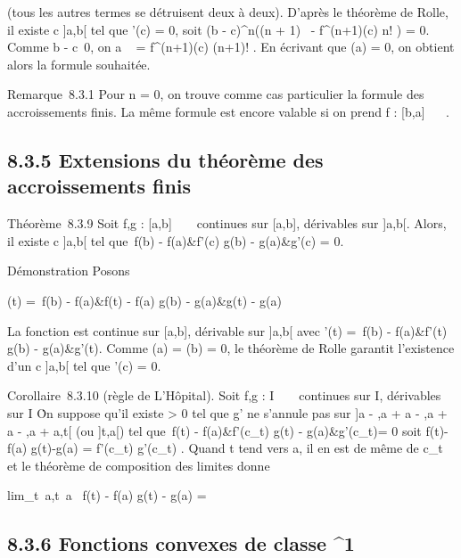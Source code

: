 (tous les autres termes se détruisent deux à deux). D'après le théorème
de Rolle, il existe c \in]a,b[ tel que \phi'(c) = 0, soit (b -
c)^n\left ((n + 1)\lambda~ - f^(n+1)(c)
\over n! \right ) = 0. Comme b -
c\neq~0, on a \lambda~ = f^(n+1)(c)
\over (n+1)! . En écrivant que \phi(a) = 0, on obtient
alors la formule souhaitée.

Remarque~8.3.1 Pour n = 0, on trouve comme cas particulier la formule
des accroissements finis. La même formule est encore valable si on prend
f : [b,a] \rightarrow~ ~.

\subsection{8.3.5 Extensions du théorème des accroissements finis}

Théorème~8.3.9 Soit f,g : [a,b] \rightarrow~ ~ continues sur [a,b],
dérivables sur ]a,b[. Alors, il existe c \in]a,b[ tel que
\left
\matrix\,f(b) - f(a)&f'(c)
\cr g(b) - g(a)&g'(c)\right 
= 0.

Démonstration Posons

\phi(t) = \left
\matrix\,f(b) - f(a)&f(t) -
f(a) \cr g(b) - g(a)&g(t) - g(a)\right


La fonction \phi est continue sur [a,b], dérivable sur ]a,b[ avec
\phi'(t) = \left
\matrix\,f(b) - f(a)&f'(t)
\cr g(b) - g(a)&g'(t)\right .
Comme \phi(a) = \phi(b) = 0, le théorème de Rolle garantit l'existence d'un c
\in]a,b[ tel que \phi'(c) = 0.

Corollaire~8.3.10 (règle de L'Hôpital). Soit f,g : I \rightarrow~ ~ continues sur
I, dérivables sur I \diagdown\a\. On suppose
qu'il existe \eta > 0 tel que g' ne s'annule pas sur ]a -
\eta,a + a - \eta,a +
a - \eta,a +
a,t[ (ou ]t,a[) tel que \left
\matrix\,f(t) -
f(a)&f'(c_t) \cr g(t) -
g(a)&g'(c_t)\right  = 0 soit 
f(t)-f(a) \over g(t)-g(a) = f'(c_t)
\over g'(c_t) . Quand t tend vers a, il en est
de même de c_t et le théorème de composition des limites donne

lim_t\rightarrow~a,t\neq~a~
f(t) - f(a) \over g(t) - g(a) = \ell

\subsection{8.3.6 Fonctions convexes de classe ^1}

